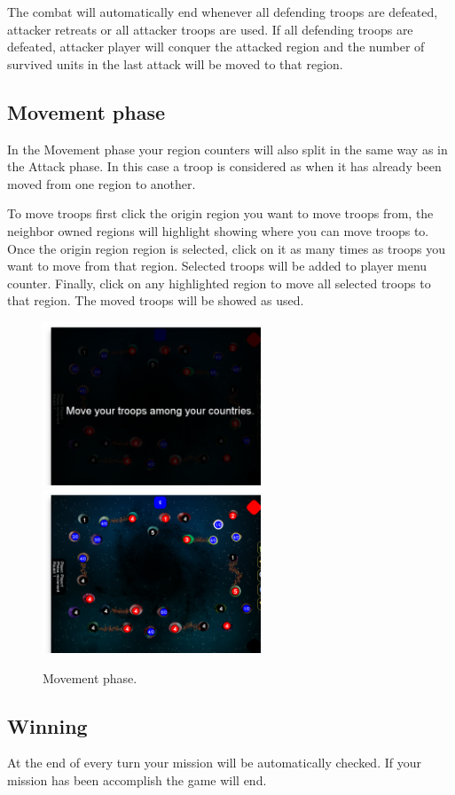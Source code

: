 \documentclass[12pt,a4paper]{article}
\begin{document}
The combat will automatically end whenever all defending troops are defeated, attacker retreats or all attacker troops are used. If all defending troops are defeated, attacker player will conquer the attacked region and the number of survived units in the last attack will be moved to that region.

\subsection{Movement phase}
In the Movement phase your region counters will also split in the same way as in the Attack phase. In this case a troop is considered as when it has already been moved from one region to another.

To move troops first click the origin region you want to move troops from, the neighbor owned regions will highlight showing where you can move troops to. Once the origin region region is selected, click on it as many times as troops you want to move from that region. Selected troops will be added to player menu counter. Finally, click on any highlighted region to move all selected troops to that region. The moved troops will be showed as used.

\begin{figure}[h!]
\centering
\includegraphics[width=6.5cm]{pic/screenshot11.png}
\includegraphics[width=6.5cm]{pic/screenshot12.png}
\caption{Movement phase.}
\label{fig:move}
\end{figure}

\subsection{Winning}
At the end of every turn your mission will be automatically checked. If your mission has been accomplish the game will end.
\end{document}
